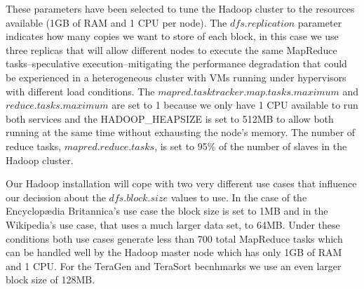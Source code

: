 These parameters have been selected to tune the Hadoop cluster to the resources available (1GB of RAM and 1 CPU per node). The $dfs.replication$ parameter indicates how many copies we want to store of each block, in this case we use three replicas that will allow different nodes to execute the same MapReduce tasks--speculative execution--mitigating the performance degradation that could be experienced in a heterogeneous cluster with VMs running under hypervisors with different load conditions. The $mapred.tasktracker.map.tasks.maximum$ and $reduce.tasks.maximum$ are set to 1 because we only have 1 CPU available to run both services and the HADOOP\_HEAPSIZE is set to 512MB to allow both running at the same time without exhausting the node's memory. The number of reduce tasks, $mapred.reduce.tasks$, is set to 95\% of the number of slaves in the Hadoop cluster. 

Our Hadoop installation will cope with two very different use cases that influence our decission about the $dfs.block.size$ values to use. In the case of the Encyclop{\ae}dia Britannica's use case the block size is set to 1MB and in the Wikipedia's use case, that uses a much larger data set, to 64MB. Under these conditions both use cases generate less than 700 total MapReduce tasks which can be handled well by the Hadoop master node which has only 1GB of RAM and 1 CPU. For the TeraGen and TeraSort becnhmarks we use an even larger block size of 128MB.


